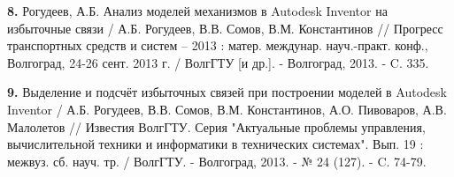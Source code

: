 {\textbf{8.}} Рогудеев, А.Б. Анализ моделей механизмов в Autodesk Inventor на избыточные связи / А.Б. Рогудеев, В.В. Сомов, В.М. Константинов // Прогресс транспортных средств и систем – 2013 : матер. междунар. науч.-практ. конф., Волгоград, 24-26 сент. 2013 г. / ВолгГТУ [и др.]. - Волгоград, 2013. - C. 335.

{\textbf{9.}} Выделение и подсчёт избыточных связей при построении моделей в Autodesk Inventor / А.Б. Рогудеев, В.В. Сомов, В.М. Константинов, А.О. Пивоваров, А.В. Малолетов // Известия ВолгГТУ. Серия "Актуальные проблемы управления, вычислительной техники и информатики в технических системах". Вып. 19 : межвуз. сб. науч. тр. / ВолгГТУ. - Волгоград, 2013. - № 24 (127). - C. 74-79.
